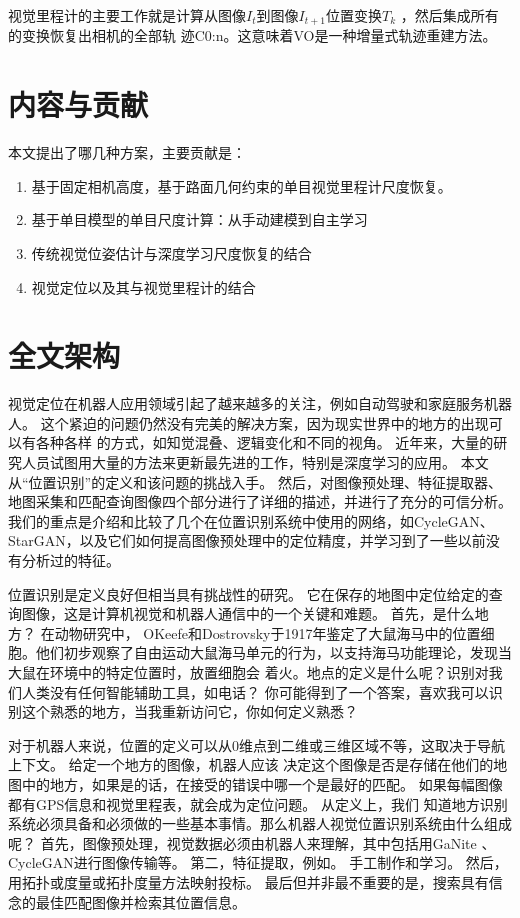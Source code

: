 视觉里程计的主要工作就是计算从图像$I_t$到图像$I_{t+1}$位置变换$T_k$ ，然后集成所有的变换恢复出相机的全部轨
迹C0:n。这意味着VO是一种增量式轨迹重建方法。


\section{内容与贡献}
本文提出了哪几种方案，主要贡献是：
\begin{enumerate}
	\item 基于固定相机高度，基于路面几何约束的单目视觉里程计尺度恢复。
	\item 基于单目模型的单目尺度计算：从手动建模到自主学习
	\item 传统视觉位姿估计与深度学习尺度恢复的结合
	\item 视觉定位以及其与视觉里程计的结合
\end{enumerate}

\section{全文架构}

视觉定位在机器人应用领域引起了越来越多的关注，例如自动驾驶和家庭服务机器人。 这个紧迫的问题仍然没有完美的解决方案，因为现实世界中的地方的出现可以有各种各样
的方式，如知觉混叠、逻辑变化和不同的视角。 近年来，大量的研究人员试图用大量的方法来更新最先进的工作，特别是深度学习的应用。 本文从“位置识别”的定义和该问题的挑战入手。
然后，对图像预处理、特征提取器、地图采集和匹配查询图像四个部分进行了详细的描述，并进行了充分的可信分析。 我们的重点是介绍和比较了几个在位置识别系统中使用的网络，如CycleGAN、StarGAN，以及它们如何提高图像预处理中的定位精度，并学习到了一些以前没有分析过的特征。

位置识别是定义良好但相当具有挑战性的研究。 它在保存的地图中定位给定的查询图像，这是计算机视觉和机器人通信中的一个关键和难题。 首先，是什么地方？ 在动物研究中，
OKeefe和Dostrovsky于1917年鉴定了大鼠海马中的位置细胞。他们初步观察了自由运动大鼠海马单元的行为，以支持海马功能理论，发现当大鼠在环境中的特定位置时，放置细胞会
着火。地点的定义是什么呢？识别对我们人类没有任何智能辅助工具，如电话？ 你可能得到了一个答案，喜欢我可以识别这个熟悉的地方，当我重新访问它，你如何定义熟悉？

对于机器人来说，位置的定义可以从0维点到二维或三维区域不等，这取决于导航上下文\cite{lowry2016visual}\cite{kuipers2000spatial}。 给定一个地方的图像，机器人应该
决定这个图像是否是存储在他们的地图中的地方，如果是的话，在接受的错误中哪一个是最好的匹配。 如果每幅图像都有GPS信息和视觉里程表，就会成为定位问题。 从定义上，我们
知道地方识别系统必须具备和必须做的一些基本事情。那么机器人视觉位置识别系统由什么组成呢？ 首先，图像预处理，视觉数据必须由机器人来理解，其中包括用GaNite
\cite{latif2017addressing}、CycleGAN\cite{zhu2017unpaired}进行图像传输等。 第二，特征提取，例如。 手工制作和学习。 然后，用拓扑或度量或拓扑度量方法映射投标。
最后但并非最不重要的是，搜索具有信念的最佳匹配图像并检索其位置信息。

